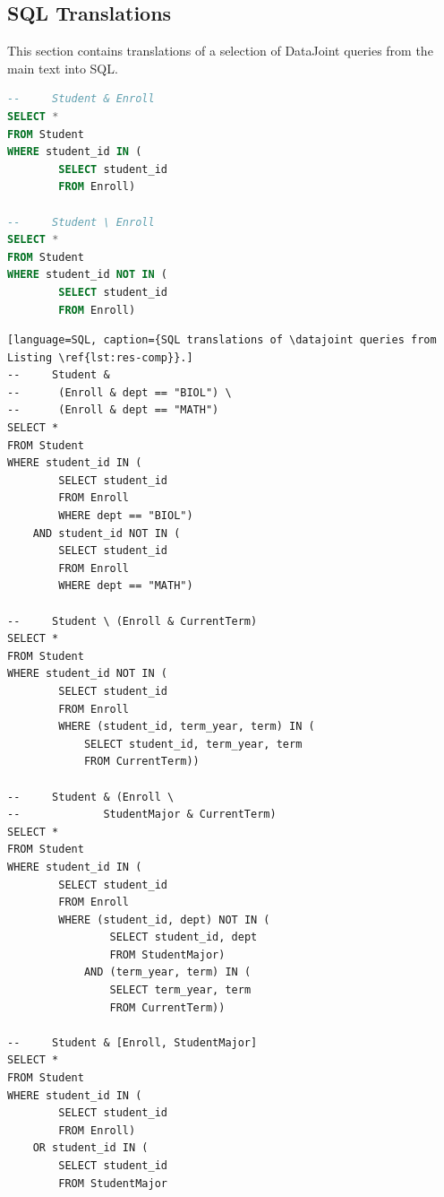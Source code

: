 \documentclass[letter,10pt]{article}
\newcommand{\datajoint}{DataJoint\xspace}
\begin{document}
\begin{appendices}

\section{SQL Translations}
This section contains translations of a selection of \datajoint queries from the main text into SQL. 
\begin{lstlisting}[language=SQL, caption={SQL translations of \datajoint queries from Listing \ref{lst:res-set}}]
--     Student & Enroll
SELECT * 
FROM Student 
WHERE student_id IN (
        SELECT student_id 
        FROM Enroll)

--     Student \ Enroll
SELECT * 
FROM Student 
WHERE student_id NOT IN (
        SELECT student_id 
        FROM Enroll)
\end{lstlisting}

\begin{lstlisting}[language=SQL, caption={SQL translations of \datajoint queries from Listing \ref{lst:res-comp}}.]
--     Student &
--      (Enroll & dept == "BIOL") \
--      (Enroll & dept == "MATH")
SELECT * 
FROM Student 
WHERE student_id IN (
        SELECT student_id 
        FROM Enroll
        WHERE dept == "BIOL")
    AND student_id NOT IN (
        SELECT student_id
        FROM Enroll
        WHERE dept == "MATH")

--     Student \ (Enroll & CurrentTerm)
SELECT *
FROM Student
WHERE student_id NOT IN (
        SELECT student_id 
        FROM Enroll
        WHERE (student_id, term_year, term) IN (
            SELECT student_id, term_year, term
            FROM CurrentTerm))

--     Student & (Enroll \ 
--             StudentMajor & CurrentTerm)
SELECT *
FROM Student 
WHERE student_id IN (
        SELECT student_id 
        FROM Enroll
        WHERE (student_id, dept) NOT IN ( 
                SELECT student_id, dept 
                FROM StudentMajor)
            AND (term_year, term) IN (
                SELECT term_year, term
                FROM CurrentTerm))

--     Student & [Enroll, StudentMajor]
SELECT * 
FROM Student
WHERE student_id IN (
        SELECT student_id
        FROM Enroll)
    OR student_id IN (
        SELECT student_id
        FROM StudentMajor

\end{lstlisting}
\end{appendices}



\end{document}
